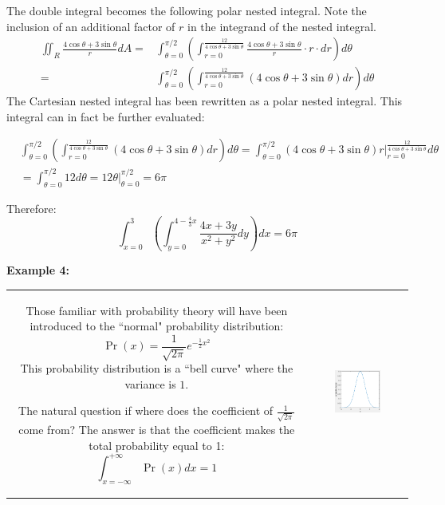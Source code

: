 \documentclass{article}
\begin{document}
The double integral becomes the following polar nested integral. Note the inclusion of an additional factor of \(r\) in the integrand of the nested integral.
\begin{align*}
\iint_R \frac{4\cos\theta + 3\sin\theta}{r} dA = & \int_{\theta = 0}^{\pi/2} \left(\int_{r = 0}^{\frac{12}{4\cos\theta + 3\sin\theta}} \frac{4\cos\theta + 3\sin\theta}{r} \cdot r \cdot dr\right)d\theta \\
= & \int_{\theta = 0}^{\pi/2} \left(\int_{r = 0}^{\frac{12}{4\cos\theta + 3\sin\theta}} (4\cos\theta + 3\sin\theta)dr\right)d\theta
\end{align*}
The Cartesian nested integral has been rewritten as a polar nested integral. This integral can in fact be further evaluated:

\begin{align*}
& \int_{\theta = 0}^{\pi/2} \left(\int_{r = 0}^{\frac{12}{4\cos\theta + 3\sin\theta}} (4\cos\theta + 3\sin\theta)dr\right)d\theta 
= \int_{\theta = 0}^{\pi/2} (4\cos\theta + 3\sin\theta)r \Big|_{r = 0}^{\frac{12}{4\cos\theta + 3\sin\theta}} d\theta \\ 
& = \int_{\theta = 0}^{\pi/2} 12 d\theta 
= 12\theta \Big|_{\theta = 0}^{\pi/2} 
= 6\pi
\end{align*}

Therefore:
\[\int_{x = 0}^3 \left(\int_{y = 0}^{4 - \frac{4}{3}x} \frac{4x + 3y}{x^2 + y^2} dy\right)dx = 6\pi\]





\vspace{5mm}

\textbf{Example 4:}

\vspace{5mm}

\begin{tabular}{cc}
\parbox{0.5\textwidth}{
Those familiar with probability theory will have been introduced to the ``normal" probability distribution:
\[\Pr(x) = \frac{1}{\sqrt{2\pi}}e^{-\frac{1}{2}x^2}\]
This probability distribution is a ``bell curve" where the variance is \(1\).

The natural question if where does the coefficient of \(\frac{1}{\sqrt{2\pi}}\) come from? The answer is that the coefficient makes the total probability equal to 1:
\[\int_{x = -\infty}^{+\infty} \Pr(x) dx = 1\]
} & \parbox{0.5\textwidth}{
\includegraphics[width = 0.5\textwidth]{bell_curve_plot.png}
}
\end{tabular}
\end{document}
